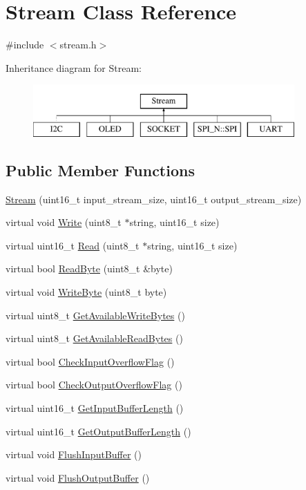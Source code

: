 \hypertarget{class_stream}{}\section{Stream Class Reference}
\label{class_stream}


{\ttfamily \#include $<$stream.\+h$>$}

Inheritance diagram for Stream\+:\begin{figure}[H]
\begin{center}
\leavevmode
\includegraphics[height=2.000000cm]{class_stream}
\end{center}
\end{figure}
\subsection*{Public Member Functions}
\begin{DoxyCompactItemize}
\item 
\hyperlink{class_stream_a2b738d6f4d3059de2ae3d444d68663bf}{Stream} (uint16\+\_\+t input\+\_\+stream\+\_\+size, uint16\+\_\+t output\+\_\+stream\+\_\+size)
\item 
virtual void \hyperlink{class_stream_a508be3423e4d99ab2757275fb723002a}{Write} (uint8\+\_\+t $\ast$string, uint16\+\_\+t size)
\item 
virtual uint16\+\_\+t \hyperlink{class_stream_a851572e5787cd98383d5118de378724b}{Read} (uint8\+\_\+t $\ast$string, uint16\+\_\+t size)
\item 
virtual bool \hyperlink{class_stream_a6db4180f5834073f992608b856bddca2}{Read\+Byte} (uint8\+\_\+t \&byte)
\item 
virtual void \hyperlink{class_stream_aeaed767b3a8d946c6f81465fa83ff17f}{Write\+Byte} (uint8\+\_\+t byte)
\item 
virtual uint8\+\_\+t \hyperlink{class_stream_a6a16ddb03d3360cef4daf4d38245091d}{Get\+Available\+Write\+Bytes} ()
\item 
virtual uint8\+\_\+t \hyperlink{class_stream_a71cec6c46f3d50cc3ab420e93ae434e1}{Get\+Available\+Read\+Bytes} ()
\item 
virtual bool \hyperlink{class_stream_a088c4e68d568acfad715c56f408fe9f8}{Check\+Input\+Overflow\+Flag} ()
\item 
virtual bool \hyperlink{class_stream_aee6c201819b874c5934a270592d9d311}{Check\+Output\+Overflow\+Flag} ()
\item 
virtual uint16\+\_\+t \hyperlink{class_stream_a4860b9602c68ab437520d321e4e97212}{Get\+Input\+Buffer\+Length} ()
\item 
virtual uint16\+\_\+t \hyperlink{class_stream_ad8aea9131dbc1b422bdba2408d63492a}{Get\+Output\+Buffer\+Length} ()
\item 
virtual void \hyperlink{class_stream_ac7e3629626c1ea4d9cba88db1e048132}{Flush\+Input\+Buffer} ()
\item 
virtual void \hyperlink{class_stream_a0af6193f98fcf7bcd60eef84fce8699c}{Flush\+Output\+Buffer} ()
\end{DoxyCompactItemize}
